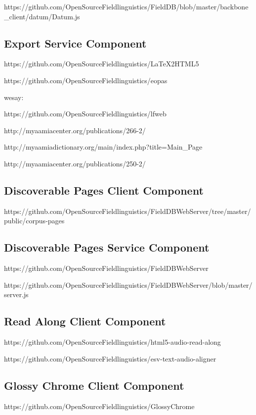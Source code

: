 \documentclass[12pt]{article}
\begin{document}
https://github.com/OpenSourceFieldlinguistics/FieldDB/blob/master/backbone_client/datum/Datum.js

\subsection{Export Service Component}


https://github.com/OpenSourceFieldlinguistics/LaTeX2HTML5

https://github.com/OpenSourceFieldlinguistics/eopas


wesay: 

https://github.com/OpenSourceFieldlinguistics/lfweb

http://myaamiacenter.org/publications/266-2/

http://myaamiadictionary.org/main/index.php?title=Main\_Page


http://myaamiacenter.org/publications/250-2/

\subsection{Discoverable Pages Client Component}

https://github.com/OpenSourceFieldlinguistics/FieldDBWebServer/tree/master/public/corpus-pages

\subsection{Discoverable Pages Service Component}

https://github.com/OpenSourceFieldlinguistics/FieldDBWebServer

https://github.com/OpenSourceFieldlinguistics/FieldDBWebServer/blob/master/server.js


\subsection{Read Along Client Component}

https://github.com/OpenSourceFieldlinguistics/html5-audio-read-along

https://github.com/OpenSourceFieldlinguistics/esv-text-audio-aligner

\subsection{Glossy Chrome Client Component}

https://github.com/OpenSourceFieldlinguistics/GlossyChrome
\end{document}
